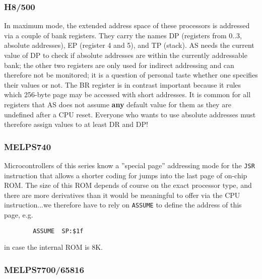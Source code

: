 \documentclass[12pt,twoside]{report}
\newcommand{\bb}[1]{{\bf #1}}
\newcommand{\tty}[1]{{\tt #1}}
\newcommand{\asname}{{AS}}
\begin{document}

\subsubsection{H8/500}

In maximum mode, the extended address space of these processors is
addressed via a couple of bank registers.  They carry the names DP
(registers from 0..3, absolute addresses), EP (register 4 and 5), and TP
(stack).  \asname{} needs the current value of DP to check if absolute addresses
are within the currently addressable bank; the other two registers are
only used for indirect addressing and can therefore not be monitored; it
is a question of personal taste whether one specifies their values or not.
The BR register is in contrast important because it rules which 256-byte
page may be accessed with short addresses.  It is common for all registers
that \asname{} does not assume \bb{any} default value for them as they are
undefined after a CPU reset.  Everyone who wants to use absolute addresses
must therefore assign values to at least DR and DP!


\subsubsection{MELPS740}

Microcontrollers of this series know a ''special page'' addressing mode
for the \tty{JSR} instruction that allows a shorter coding for jumps into
the last page of on-chip ROM.  The size of this ROM depends of course
on the exact processor type, and there are more derivatives than it
would be meaningful to offer via the CPU instruction...we therefore
have to rely on \tty{ASSUME} to define the address of this page, e.g.
\begin{verbatim}
        ASSUME  SP:$1f
\end{verbatim}
in case the internal ROM is 8K.


\subsubsection{MELPS7700/65816}
\end{document}
